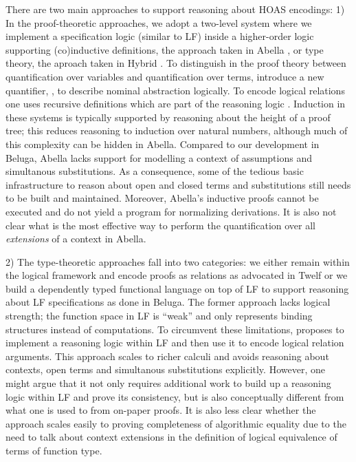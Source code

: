 \documentclass[copyright,creativecommons]{eptcs}
\newcommand{\LONGVERSION}[1]{}
\begin{document}
There are two main approaches to support reasoning about HOAS encodings: 1) In
the proof-theoretic approaches, we adopt a two-level system where we implement a
specification logic (similar to LF) inside a higher-order logic supporting
(co)inductive definitions, the approach taken in Abella
\citep{Gacek:IJCAR08}, or type theory, the aproach taken in Hybrid
\citep{Momigliano:LFMTP07}.  \LONGVERSION{Hypothetical judgments of object logics are
modelled using implication in the SL and parametric judgments are handled via
(generic) universal quantification. Substituting for an assumption is then
justified by appealing to the cut-admissibility lemma of the SL.} To distinguish
in the proof theory between quantification over variables and  quantification
over terms, \cite{Gacek:LICS08} introduce a new quantifier, , to
describe nominal abstraction logically. To encode logical relations one
uses recursive definitions which are part of the reasoning logic \citep{Gacek:LFMTP09}. 
Induction in these systems is typically supported by reasoning about the  height
of a proof tree; this reduces reasoning to induction over natural numbers,
although much of this complexity can be hidden in Abella. 
Compared to our development in Beluga, Abella lacks support for modelling a
context of assumptions and simultanous substitutions. As a consequence, some of
the tedious basic infrastructure to reason about open and closed terms and
substitutions still needs to be built and maintained. Moreover, Abella's
inductive proofs cannot be executed and do not yield a program for normalizing
derivations. It is also not clear what is the most effective way to
perform the quantification over all \emph{extensions} of a context in Abella.

2) The type-theoretic approaches fall into two categories: we either remain
within the logical framework and encode proofs as relations as advocated in 
Twelf  \citep{Pfenning99cade} or we build a dependently typed functional
language on top of LF to support reasoning about LF specifications as done in
Beluga. The former approach lacks logical
strength; the function space in LF is ``weak'' and only represents binding
structures instead of computations. To circumvent these limitations,
\cite{Schurmann:LICS08} proposes to implement a reasoning logic within LF and
then use it to encode logical relation arguments. This approach scales to richer
calculi \citep{Rasmussen:LFMTP13} and avoids reasoning about contexts, open terms
and simultanous substitutions explicitly. However, one might argue that it not
only requires additional work to build up a reasoning logic within
LF and prove its consistency, but is also conceptually different from what one is
used to from on-paper proofs. It is also less clear whether the approach scales
easily to proving completeness of algorithmic equality due to the need to talk
about context extensions in the definition 
of logical equivalence of terms of function type.
\end{document}
